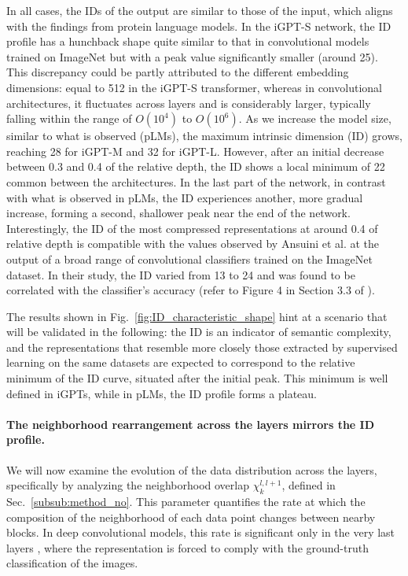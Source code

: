 \documentclass{article}
\begin{document}
In all cases, the IDs of the output are similar to those of the input, which aligns with the findings from protein language models.
%
 In the iGPT-S network, the ID profile has a hunchback shape quite similar to that in convolutional models trained on ImageNet \cite{ansuini2019intrinsic} but with a peak value significantly smaller (around 25).  
 This discrepancy could be partly attributed to the different embedding dimensions: equal to 512 in the iGPT-S transformer, whereas in convolutional architectures, it fluctuates across layers and is considerably larger, typically falling within the range of $O(10^4)$ to $O(10^6)$.  
%
As we increase the model size, similar to what is observed (pLMs), the maximum intrinsic dimension (ID) grows, reaching 28 for iGPT-M and 32 for iGPT-L. 
%
However, after an initial decrease between 0.3 and 0.4 of the relative depth, the ID shows a local minimum of 22 common between the architectures.
%
In the last part of the network, in contrast with what is observed in pLMs, the ID experiences another, more gradual increase, forming a second, shallower peak near the end of the network.
%
Interestingly, the ID of the most compressed representations at around 0.4 of relative depth is compatible with the values observed by Ansuini et al. \cite{ansuini2019intrinsic} at the output of a broad range of convolutional classifiers trained on the ImageNet dataset. 
%
In their study, the ID varied from 13 to 24 and was found to be correlated with the classifier's accuracy (refer to Figure 4 in Section 3.3 of \cite{ansuini2019intrinsic}).
%

The results shown in  Fig.~\ref{fig:ID_characteristic_shape} hint at a scenario that will be validated in the following: the ID is an indicator of semantic complexity, and the representations that resemble more closely those extracted by supervised learning on the same datasets are expected to correspond to the relative minimum of the ID curve, situated after the initial peak. This minimum is well defined in iGPTs, while in pLMs, the ID profile forms a plateau. 

%
\paragraph{The neighborhood rearrangement across the layers mirrors the ID profile.}
\label{subsub:nnevolution}
%
We will now examine the evolution of the data distribution across the layers, specifically by analyzing the neighborhood overlap $\chi_k^{l,l+1}$, defined in Sec.~\ref{subsub:method_no}.
This parameter quantifies the rate at which the composition of the neighborhood of each data point changes between nearby blocks.
%
In deep convolutional models, this rate is significant only in the very last layers \cite{doimo2020hierarchical}, where the representation is forced to comply with the ground-truth classification of the images.  
     
\end{document}
